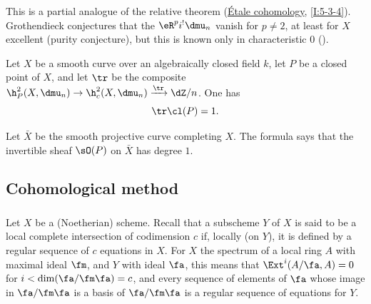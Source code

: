 \documentclass[oneside]{book}
\begin{document}
This is a partial analogue of the relative theorem
(\hyperref[I]{Étale cohomology}, \ref{I:5-3-4}). Grothendieck conjectures
that the $\eR^p i^! \dmu_n$ vanish for $p\ne 2$, at least for $X$ excellent
(purity conjecture), but this is known only in characteristic $0$
(\cite[XIX]{sga4}).






\begin{theorem}\label{IV:2-1-5}
Let $X$ be a smooth curve over an algebraically closed field $k$, let $P$ be a
closed point of $X$, and let $\tr$ be the composite
$\h_P^2(X,\dmu_n) \to \h_c^2(X,\dmu_n) \xrightarrow{\tr} \dZ/n$. One has
\[
  \tr \cl(P) = 1 \text{.}
\]
\end{theorem}

Let $\bar X$ be the smooth projective curve completing $X$. The formula says
that the invertible sheaf $\sO(P)$ on $\bar X$ has degree $1$.











\subsection{Cohomological method}\label{IV:2-2}






\subsubsection{}\label{IV:2-2-1}

Let $X$ be a (Noetherian) scheme. Recall that a subscheme $Y$ of $X$ is said
to be a local complete intersection of codimension $c$ if, locally (on $Y$),
it is defined by a regular sequence of $c$ equations in $X$. For $X$ the
spectrum of a local ring $A$ with maximal ideal $\fm$, and $Y$ with ideal
$\fa$, this means that $\Ext^i(A/\fa,A) = 0$ for
$i<\dim(\fa/\fm\fa)=c$, and every sequence of elements of $\fa$ whose image
in $\fa/\fm\fa$ is a basis of $\fa/\fm\fa$ is a regular sequence of
equations for $Y$.






\subsubsection{}\label{IV:2-2-2}
\end{document}
